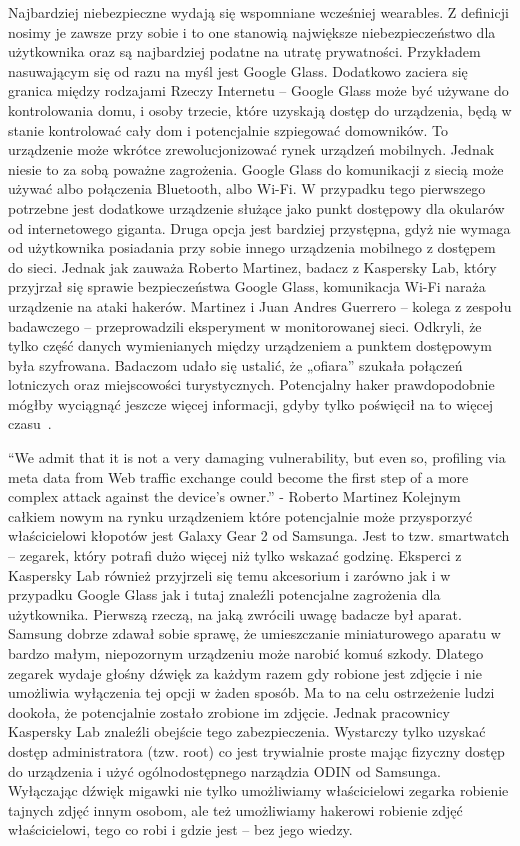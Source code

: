 \documentclass[brudnopis]{xmgr}
\begin{document}
Najbardziej niebezpieczne wydają się wspomniane wcześniej wearables. Z definicji nosimy je zawsze przy sobie i to one stanowią największe niebezpieczeństwo dla użytkownika oraz są najbardziej podatne na utratę prywatności. Przykładem nasuwającym się od razu na myśl jest Google Glass. Dodatkowo zaciera się granica między rodzajami Rzeczy Internetu – Google Glass może być używane do kontrolowania domu, i osoby trzecie, które uzyskają dostęp do urządzenia, będą w stanie kontrolować cały dom i potencjalnie  szpiegować domowników.
To urządzenie może wkrótce zrewolucjonizować rynek urządzeń mobilnych. Jednak niesie to za sobą poważne zagrożenia. Google Glass do komunikacji z siecią może używać albo połączenia Bluetooth, albo Wi-Fi. W przypadku tego pierwszego potrzebne jest dodatkowe urządzenie służące jako punkt dostępowy dla okularów od internetowego giganta. Druga opcja jest bardziej przystępna, gdyż nie wymaga od użytkownika posiadania przy sobie innego urządzenia mobilnego z dostępem do sieci. Jednak jak zauważa Roberto Martinez, badacz z Kaspersky Lab, który przyjrzał się sprawie bezpieczeństwa Google Glass, komunikacja Wi-Fi naraża urządzenie na ataki hakerów. Martinez i Juan Andres Guerrero – kolega z zespołu badawczego – przeprowadzili eksperyment w monitorowanej sieci. Odkryli, że tylko część danych wymienianych między urządzeniem a punktem dostępowym była szyfrowana. Badaczom udało się ustalić, że „ofiara” szukała połączeń lotniczych oraz miejscowości turystycznych. Potencjalny haker prawdopodobnie mógłby wyciągnąć jeszcze więcej informacji, gdyby tylko poświęcił na to więcej czasu~\cite{Abusing}.

“We admit that it is not a very damaging vulnerability, but even so, profiling via meta data from Web traffic exchange could become the first step of a more complex attack against the device’s owner.” - Roberto Martinez
Kolejnym całkiem nowym na rynku urządzeniem które potencjalnie może przysporzyć właścicielowi kłopotów jest Galaxy Gear 2 od Samsunga. Jest to tzw. smartwatch – zegarek, który potrafi dużo więcej niż tylko wskazać godzinę. Eksperci z Kaspersky Lab również przyjrzeli się temu akcesorium i zarówno jak i w przypadku Google Glass jak i tutaj znaleźli potencjalne zagrożenia dla użytkownika. Pierwszą rzeczą, na jaką zwrócili uwagę badacze był aparat. Samsung dobrze zdawał sobie sprawę, że umieszczanie miniaturowego aparatu w bardzo małym, niepozornym urządzeniu może narobić komuś szkody. Dlatego zegarek wydaje głośny dźwięk za każdym razem gdy robione jest zdjęcie i nie umożliwia wyłączenia tej opcji w żaden sposób. Ma to na celu ostrzeżenie ludzi dookoła, że potencjalnie zostało zrobione im zdjęcie. Jednak pracownicy Kaspersky Lab znaleźli obejście tego zabezpieczenia. Wystarczy tylko uzyskać dostęp administratora (tzw. root) co jest trywialnie proste mając fizyczny dostęp do urządzenia i użyć ogólnodostępnego narządzia ODIN od Samsunga. Wyłączając dźwięk migawki nie tylko umożliwiamy właścicielowi zegarka robienie tajnych zdjęć innym osobom, ale też umożliwiamy hakerowi robienie zdjęć właścicielowi, tego co robi i gdzie jest – bez jego wiedzy.
\end{document}
